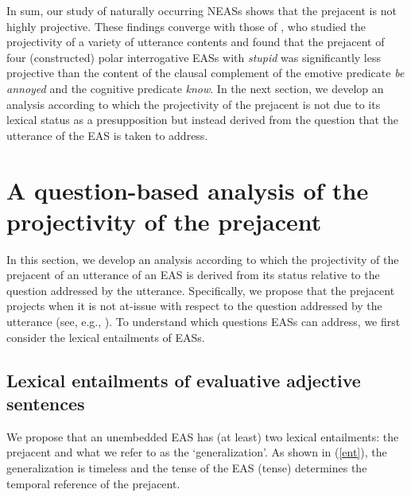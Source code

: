 \documentclass[11pt,fleqn]{article}
\newcommand{\6}{\mbox{$[\hspace*{-.6mm}[$}}
\newcommand{\9}{\mbox{$]\hspace*{-.6mm}]$}}
\begin{document}
In sum, our study of naturally occurring NEASs shows that the prejacent is not highly projective. These findings converge with those of \citet{tbd-variability}, who studied the projectivity of a variety of utterance contents and found that the prejacent of four (constructed) polar interrogative EASs with {\em stupid} was significantly less projective than the content of the clausal complement of the emotive predicate {\em be annoyed} and the cognitive predicate {\em know}. In the next section, we develop an analysis according to which the projectivity of the prejacent is not due to its lexical status as a presupposition but instead derived from the question that the utterance of the EAS is taken to address. 
 

\section{A question-based analysis of the projectivity of the prejacent}\label{s3}

In this section, we develop an analysis according to which the projectivity of the prejacent of an utterance of an EAS is derived from its status relative to the question addressed by the utterance. Specifically, we propose that the prejacent projects when it is not at-issue with respect to the question addressed by the utterance (see, e.g., \citealt{brst-salt10,brst-ar,best-question}). To understand which questions EASs can address, we first consider the lexical entailments of EASs.

\subsection{Lexical entailments of evaluative adjective sentences}\label{s31}

We propose that an unembedded EAS has (at least) two lexical entailments: the prejacent and what we refer to as the `generalization'. As shown in (\ref{ent}), the generalization is timeless and the tense of the EAS ({\sc tense}) determines the temporal reference of the prejacent.
\end{document}
